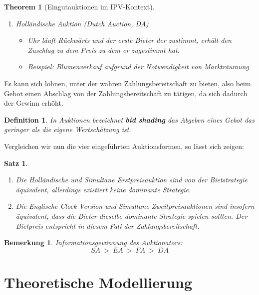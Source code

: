 \documentclass[12pt]{extreport} %
\theoremstyle{named}
\theoremstyle{nnamed}
\newtheorem*{unnamedtheorem*}{Theorem}
\theoremstyle{itshape}
\newtheorem{satz}[unnamedtheorem]{Satz}
\newtheorem*{definition}{Definition}
\theoremstyle{normal}
\newtheorem*{bemerkung}{Bemerkung}
\begin{document}
\begin{unnamedtheorem*}[Eingutauktionen im IPV-Kontext]
\begin{enumerate}
\begin{itemize}
				\item Preis: Vorletzter Preis ist Kaufpreis.
			\end{itemize}
		\item Holländische Auktion (Dutch Auction, DA)   
			\begin{itemize}
				\item Uhr läuft Rückwärts und der erste Bieter der zustimmt, erhält den Zuschlag zu dem Preis zu dem er zugestimmt hat.
				\item Beispiel: Blumenverkauf aufgrund der Notwendigkeit von Markträumung
			\end{itemize}
	\end{enumerate}
\end{unnamedtheorem*}

Es kann sich lohnen, unter der wahren Zahlungsbereitschaft zu bieten, also beim Gebot einen Abschlag von der Zahlungsbereitschaft zu tätigen, da sich dadurch der Gewinn erhöht.

\begin{definition}
	In Auktionen bezeichnet \textbf{bid shading} das Abgeben eines Gebot das geringer als die eigene Wertschätzung ist.
\end{definition}

Vergleichen wir nun die vier eingeführten Auktionsformen, so lässt sich zeigen:

\begin{satz} ~\
	\begin{enumerate}
		\item Die Holländische und Simultane Erstpreisauktion sind von der Bietstrategie äquivalent, allerdings existiert keine dominante Strategie.
		\item Die Englische Clock Version und Simultane Zweitpreisauktionen sind insofern äquivalent, dass die Bieter dieselbe dominante Strategie spielen sollten. Der Bietpreis entspricht in diesem Fall der Zahlungsbereitschaft.
	\end{enumerate}
\end{satz}

\begin{bemerkung}
	Informationsgewinnung des Auktionators:	
	$$ SA ~ > ~ EA ~ > ~ FA ~ > ~ DA  $$
\end{bemerkung}


\chapter{Theoretische Modellierung}
\end{document}
